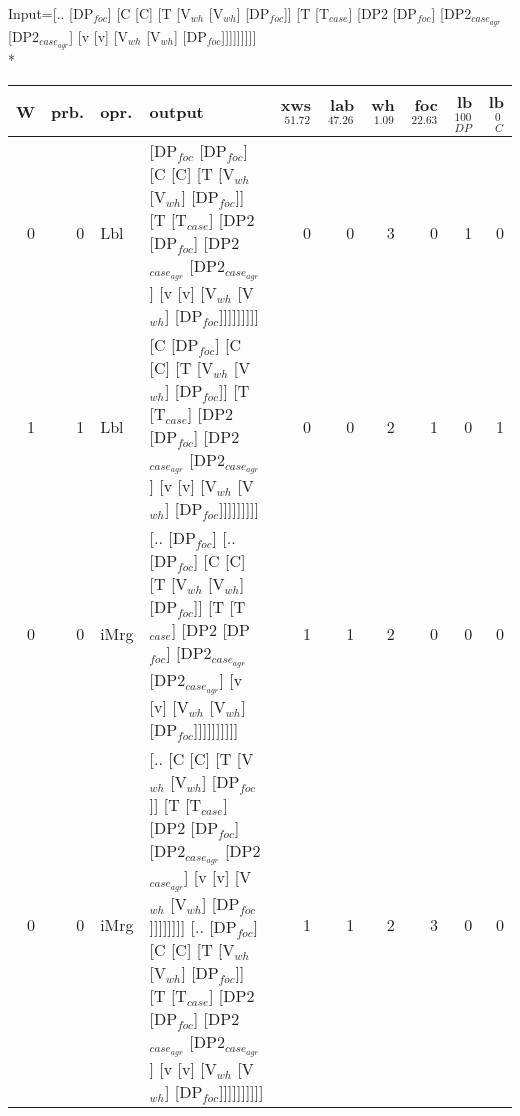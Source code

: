 \begingroup\scriptsize Input=[.. [DP$_{foc}$] [C [C] [T [V$_{wh}$ [V$_{wh}$] [DP$_{foc}$]] [T [T$_{case}$] [DP2 [DP$_{foc}$] [DP2$_{case_{agr}}$ [DP2$_{case_{agr}}$] [v [v] [V$_{wh}$ [V$_{wh}$] [DP$_{foc}$]]]]]]]]]\\*
\begin{tabularx}{\linewidth}{rrlXrrrrrr}
\hline
   W &   prb. & opr.   & output                                                                                                                                                                                                                                                                     &   xws$^{51.72}$ &   lab$^{47.26}$ &   wh$^{1.09}$ &   foc$^{22.63}$ &   lb$_{DP}^{100}$ &   lb$_{C}^{0}$ \\
\hline
   0 &   0 & Lbl  & [DP$_{foc}$ [DP$_{foc}$] [C [C] [T [V$_{wh}$ [V$_{wh}$] [DP$_{foc}$]] [T [T$_{case}$] [DP2 [DP$_{foc}$] [DP2$_{case_{agr}}$ [DP2$_{case_{agr}}$] [v [v] [V$_{wh}$ [V$_{wh}$] [DP$_{foc}$]]]]]]]]]                                                                                                                              &             0 &             0 &            3 &             0 &                1 &             0 \\
   1 &   1 & Lbl  & [C [DP$_{foc}$] [C [C] [T [V$_{wh}$ [V$_{wh}$] [DP$_{foc}$]] [T [T$_{case}$] [DP2 [DP$_{foc}$] [DP2$_{case_{agr}}$ [DP2$_{case_{agr}}$] [v [v] [V$_{wh}$ [V$_{wh}$] [DP$_{foc}$]]]]]]]]]                                                                                                                                   &             0 &             0 &            2 &             1 &                0 &             1 \\
   0 &   0 & iMrg & [.. [DP$_{foc}$] [.. [DP$_{foc}$] [C [C] [T [V$_{wh}$ [V$_{wh}$] [DP$_{foc}$]] [T [T$_{case}$] [DP2 [DP$_{foc}$] [DP2$_{case_{agr}}$ [DP2$_{case_{agr}}$] [v [v] [V$_{wh}$ [V$_{wh}$] [DP$_{foc}$]]]]]]]]]]                                                                                                                    &             1 &             1 &            2 &             0 &                0 &             0 \\
   0 &   0 & iMrg & [.. [C [C] [T [V$_{wh}$ [V$_{wh}$] [DP$_{foc}$]] [T [T$_{case}$] [DP2 [DP$_{foc}$] [DP2$_{case_{agr}}$ [DP2$_{case_{agr}}$] [v [v] [V$_{wh}$ [V$_{wh}$] [DP$_{foc}$]]]]]]]] [.. [DP$_{foc}$] [C [C] [T [V$_{wh}$ [V$_{wh}$] [DP$_{foc}$]] [T [T$_{case}$] [DP2 [DP$_{foc}$] [DP2$_{case_{agr}}$ [DP2$_{case_{agr}}$] [v [v] [V$_{wh}$ [V$_{wh}$] [DP$_{foc}$]]]]]]]]]] &             1 &             1 &            2 &             3 &                0 &             0 \\

\end{tabularx}

